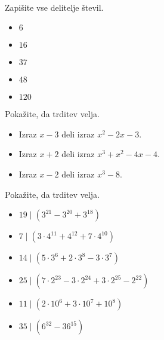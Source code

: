         
                ~\newline~
        
            \begin{naloga}
                Zapišite vse delitelje števil.
                \begin{itemize}
                    \item $6$ 
                    \item $16$ 
                    \item $37$ 
                    \item $48$ 
                    \item $120$ 
                \end{itemize}
            \end{naloga}        

        
            \begin{naloga}
                Pokažite, da trditev velja.
                \begin{itemize}
                    \item Izraz $x-3$ deli izraz $x^2-2x-3$. 
                    \item Izraz $x+2$ deli izraz $x^3+x^2-4x-4$. 
                    \item Izraz $x-2$ deli izraz $x^3-8$. 
                \end{itemize}
            \end{naloga}        

        
            \begin{naloga}
                Pokažite, da trditev velja.
                \begin{itemize}
                    \item $19\mid \left(3^{21}-3^{20}+3^{18}\right)$ 
                    \item $7\mid \left(3\cdot 4^{11}+4^{12}+7\cdot 4^{10}\right)$ 
                    \item $14\mid \left(5\cdot 3^6+2\cdot 3^8-3\cdot 3^7\right)$ 
                    \item $25\mid \left(7\cdot 2^{23}-3\cdot 2^{24}+3\cdot 2^{25}-2^{22}\right)$ 
                    \item $11\mid \left(2\cdot 10^6+3\cdot 10^7+10^8\right)$ 
                    \item $35\mid \left(6^{32}-36^{15}\right)$ 
                \end{itemize}
            \end{naloga}        

